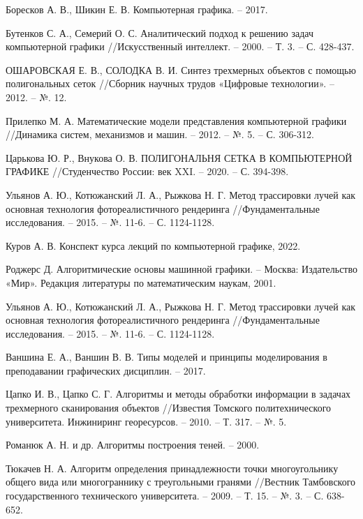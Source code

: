 \renewcommand{\bibname}{Список использованных источников}
\begin{thebibliography}{100}

Боресков А. В., Шикин Е. В. Компьютерная графика. – 2017.

Бутенков С. А., Семерий О. С. Аналитический подход к решению задач компьютерной графики //Искусственный интеллект. – 2000. – Т. 3. – С. 428-437.

ОШАРОВСКАЯ Е. В., СОЛОДКА В. И. Синтез трехмерных объектов с помощью полигональных сеток //Сборник научных трудов «Цифровые технологии». – 2012. – №. 12.

Прилепко М. А. Математические модели представления компьютерной графики //Динамика систем, механизмов и машин. – 2012. – №. 5. – С. 306-312.

Царькова Ю. Р., Внукова О. В. ПОЛИГОНАЛЬНЯ СЕТКА В КОМПЬЮТЕРНОЙ ГРАФИКЕ //Студенчество России: век XXI. – 2020. – С. 394-398.

Ульянов А. Ю., Котюжанский Л. А., Рыжкова Н. Г. Метод трассировки лучей как основная технология фотореалистичного рендеринга //Фундаментальные исследования. – 2015. – №. 11-6. – С. 1124-1128.

Куров А. В. Конспект курса лекций по компьютерной графике, 2022.

Роджерс Д. Алгоритмические основы машинной графики. – Москва: Издательство «Мир». Редакция литературы по математическим наукам, 2001.

Ульянов А. Ю., Котюжанский Л. А., Рыжкова Н. Г. Метод трассировки лучей как основная технология фотореалистичного рендеринга //Фундаментальные исследования. – 2015. – №. 11-6. – С. 1124-1128.

Ваншина Е. А., Ваншин В. В. Типы моделей и принципы моделирования в преподавании графических дисциплин. – 2017.

Цапко И. В., Цапко С. Г. Алгоритмы и методы обработки информации в задачах трехмерного сканирования объектов //Известия Томского политехнического университета. Инжиниринг георесурсов. – 2010. – Т. 317. – №. 5.

Романюк А. Н. и др. Алгоритмы построения теней. – 2000.

Тюкачев Н. А. Алгоритм определения принадлежности точки многоугольнику общего вида или многограннику с треугольными гранями //Вестник Тамбовского государственного технического университета. – 2009. – Т. 15. – №. 3. – С. 638-652.


\end{thebibliography}
